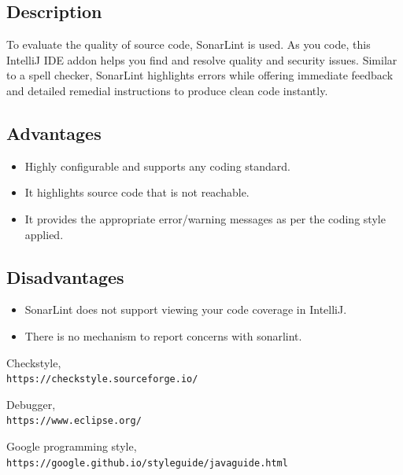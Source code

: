 \documentclass{article}
\begin{document}
    \subsection{Description}
    To evaluate the quality of source code, SonarLint is used. As you code, this IntelliJ IDE addon helps you find and resolve quality and security issues. Similar to a spell checker, SonarLint highlights errors while offering immediate feedback and detailed remedial instructions to produce clean code instantly.
    \subsection{Advantages}
    \begin{itemize}
        \item Highly configurable and supports any coding standard.
        \item It highlights source code that is not reachable.
        \item It provides the appropriate error/warning messages as per the coding style applied.
    \end{itemize}
    \subsection{Disadvantages}
    \begin{itemize}
        \item SonarLint does not support viewing your code coverage in IntelliJ.
        \item There is no mechanism to report concerns with sonarlint.
    \end{itemize}

    \begin{thebibliography}{9}
        Checkstyle,
        \\\texttt{https://checkstyle.sourceforge.io/}

        Debugger,
        \\\texttt{https://www.eclipse.org/}

        Google programming style,
        \\\texttt{https://google.github.io/styleguide/javaguide.html}

    \end{thebibliography}
\end{document}
